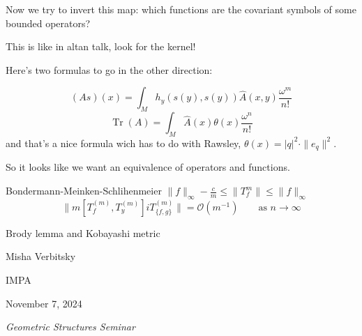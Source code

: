 Now we try to invert this map: which functions are the covariant symbols of some bounded operators?

\begin{remark}[Sergey]\leavevmode
	This is like in altan talk, look for the kernel!
\end{remark}

Here's two formulas to go in the other direction:

\[(As)(x)=\int_{M}h_y(s(y),s(y))\hat{A}(x,y)\frac{\omega^m}{n!}\]
\[\operatorname{Tr}(A)=\int_{M}\hat{A}(x)\theta(x)\frac{\omega^n}{n!}\]
and that's a nice formula wich has to do with Rawsley, $\theta(x)=|q|^2\cdot\|e_q\|^2$.

\begin{remark}[Dani]\leavevmode
	So it looks like we want an equivalence of operators and functions.
\end{remark}

\begin{thing7}{Bondermann-Meinken-Schlihenmeier}\leavevmode
	$\|f\|_\infty-\frac{c}{m}\leq \|T_f^{m}\|\leq \|f\|_\infty$
	\[\|m[T_f^{(m)}, T_y^{(m)} ]iT_{\{f,g\}}^{(m)}\|= \mathcal{O}(m^{-1})\qquad \text{as }n\to \infty \]
\end{thing7}

\clearpage{}
{\Huge Brody lemma and Kobayashi metric}

\hfill{\Large Misha Verbitsky}

{\Large \hfill IMPA}

\hfill{\large November 7, 2024

\hfill \textit{Geometric Structures Seminar}}
\vspace{2em}

